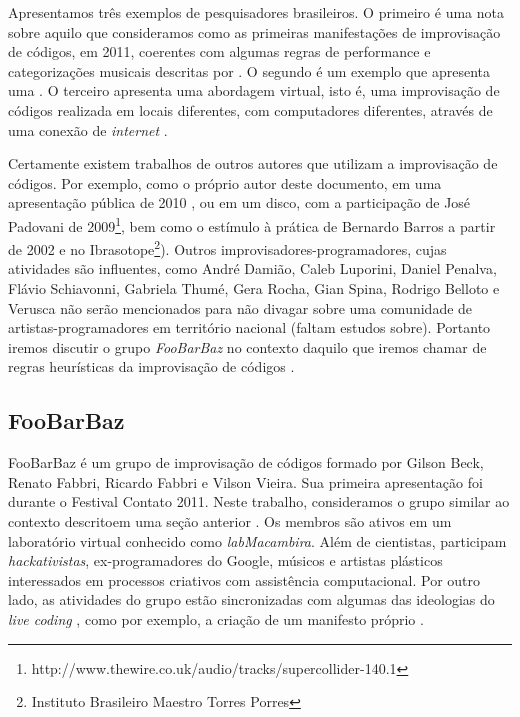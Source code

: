 Apresentamos três exemplos de pesquisadores brasileiros. O primeiro é uma nota sobre aquilo que consideramos como as primeiras manifestações de improvisação de códigos, em 2011, coerentes com algumas regras de performance e categorizações musicais  descritas por . O segundo é um exemplo que apresenta uma \cite[p.~1, ver \protect\autoref{sec:concerto}, p.~\protect\pageref{sec:concerto}]{mclean_tidal_2010}. O terceiro apresenta uma abordagem virtual, isto é, uma improvisação de códigos realizada em locais diferentes, com computadores diferentes, através de uma conexão de \emph{internet} .  

Certamente existem trabalhos de outros autores que utilizam a improvisação de códigos. Por exemplo, como o próprio autor deste documento, em uma apresentação pública de 2010 , ou em um disco, com a participação de José Padovani de 2009\footnote{http://www.thewire.co.uk/audio/tracks/supercollider-140.1}, bem como o estímulo à prática de Bernardo Barros a partir de 2002 e no Ibrasotope\footnote{Instituto Brasileiro Maestro Torres Porres}). Outros improvisadores-programadores, cujas atividades são influentes, como André Damião, Caleb Luporini, Daniel Penalva, Flávio Schiavonni, Gabriela Thumé, Gera Rocha, Gian Spina, Rodrigo Belloto e Verusca  não serão mencionados para não divagar sobre uma comunidade de artistas-programadores em território nacional (faltam estudos sobre). Portanto iremos discutir o grupo \emph{FooBarBaz} no contexto daquilo que iremos chamar de regras heurísticas da improvisação de códigos \cite{ward_live_2004}.


\subsection{FooBarBaz}\label{sec:foobarbaz}

FooBarBaz é um grupo de improvisação de códigos formado por Gilson Beck, Renato Fabbri, Ricardo Fabbri e Vilson Vieira. Sua primeira apresentação foi durante o Festival Contato 2011. Neste trabalho, consideramos o grupo similar ao contexto descritoem uma seção anterior . Os membros são ativos em um laboratório virtual conhecido como \emph{labMacambira}. Além de cientistas, participam \emph{hackativistas}, ex-programadores do Google, músicos e artistas plásticos interessados em processos criativos com assistência computacional. Por outro lado, as atividades do grupo estão sincronizadas com algumas das ideologias do \emph{live coding} , como por exemplo, a criação de um manifesto próprio \cite{vieira_vivace:_2015}.
 
